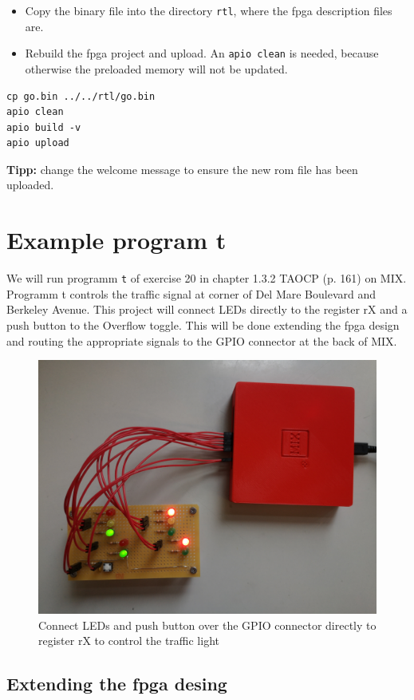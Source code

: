 \documentclass[a4paper,ngerman]{scrartcl}
\begin{document}
\begin{itemize}
	\item Copy the binary file into the directory \lstinline|rtl|, where the fpga description files are.
	\item Rebuild the fpga project and upload. An \lstinline|apio clean| is needed, because otherwise the preloaded memory will not be updated.	
\end{itemize}

\begin{lstlisting}[numbers=none,frame=none]
cp go.bin ../../rtl/go.bin
apio clean
apio build -v
apio upload
\end{lstlisting}

\textbf{Tipp:} change the welcome message to ensure the new rom file has been uploaded.

\section{Example program t}
\label{traffic}
We will run programm \lstinline|t| of exercise 20 in chapter 1.3.2 TAOCP (p. 161) on MIX. Programm t controls the traffic signal at corner of Del Mare Boulevard and Berkeley Avenue. This project will connect LEDs directly to the register rX and a push button to the  Overflow toggle. This will be done extending the fpga design and routing the appropriate signals to the GPIO connector at the back of MIX.

\begin{figure}[H]
	\centering
	\includegraphics[width=0.7\linewidth]{../MIX_traffic}
	\caption{Connect LEDs and push button over the GPIO connector directly to register rX to control the traffic light}
	\label{fig:mixtraffic}
\end{figure}


\subsection{Extending the fpga desing}
\end{document}
